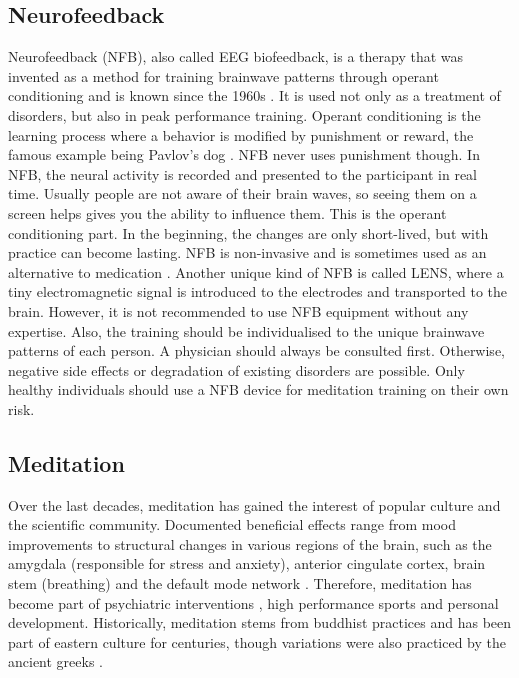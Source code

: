 \documentclass{llncs} %
\begin{document}
\subsection{Neurofeedback}
Neurofeedback (NFB), also called EEG biofeedback, is a therapy that was invented as a method for training brainwave patterns through operant conditioning and is known since the 1960s \cite{Hammond}. %
It is used not only as a treatment of disorders, but also in peak performance training.
Operant conditioning is the learning process where a behavior is modified by punishment or reward, the famous example being Pavlov's dog \cite{Spence}. NFB never uses punishment though. In NFB, the neural activity is recorded and presented to the participant in real time.  
Usually people are not aware of their brain waves, so seeing them on a screen helps gives you the ability to influence them. This is the operant conditioning part. In the beginning, the changes are only short-lived, but with practice can become lasting. 
NFB is non-invasive and is sometimes used as an alternative to medication \cite{Hammond}. Another unique kind of NFB is called LENS, where a tiny electromagnetic signal is introduced to the electrodes and transported to the brain.
However, it is not recommended to use NFB equipment without any expertise. Also, the training should be individualised to the unique brainwave patterns of each person. A physician should always be consulted first.
Otherwise, negative side effects or degradation of existing disorders are possible. Only healthy individuals should use a NFB device for meditation training on their own risk.

\subsection{Meditation}
Over the last decades, meditation has gained the interest of popular culture and the scientific community.
Documented beneficial effects range from mood improvements to structural changes \cite{Davidson} in various regions of the brain, such as the amygdala (responsible for stress and anxiety), anterior cingulate cortex, brain stem (breathing)
and the default mode network \cite{Tang:et al}.
Therefore, meditation has become part of psychiatric interventions \cite{Hoelzel}, high performance sports and personal development.
Historically, meditation stems from buddhist practices and has been part of eastern culture for centuries, though variations were also practiced by the ancient greeks \cite{Hadot:Davidson}.
\end{document}
